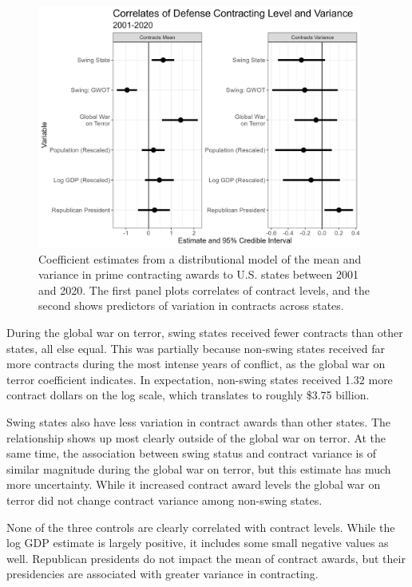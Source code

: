 \documentclass[12pt]{article}
\begin{document}
\begin{figure}[htpb]
	\centering
		\includegraphics[width=0.95\textwidth]{../figures/coef-comp-state.png}
	\caption{Coefficient estimates from a distributional model of the mean and variance in prime contracting awards to U.S. states between 2001 and 2020. The first panel plots correlates of contract levels, and the second shows predictors of variation in contracts across states.}
	\label{fig:coef-comp-state}
\end{figure}


During the global war on terror, swing states received fewer contracts than other states, all else equal. 
This was partially because non-swing states received far more contracts during the most intense years of conflict, as the global war on terror coefficient indicates. 
In expectation, non-swing states received 1.32 more contract dollars on the log scale, which translates to roughly \$3.75 billion. 


Swing states also have less variation in contract awards than other states. 
The relationship shows up most clearly outside of the global war on terror. 
At the same time, the association between swing status and contract variance is of similar magnitude during the global war on terror, but this estimate has much more uncertainty. 
While it increased contract award levels the global war on terror did not change contract variance among non-swing states. 


None of the three controls are clearly correlated with contract levels. 
While the log GDP estimate is largely positive, it includes some small negative values as well. 
Republican presidents do not impact the mean of contract awards, but their presidencies are associated with greater variance in contracting. 
\end{document}
